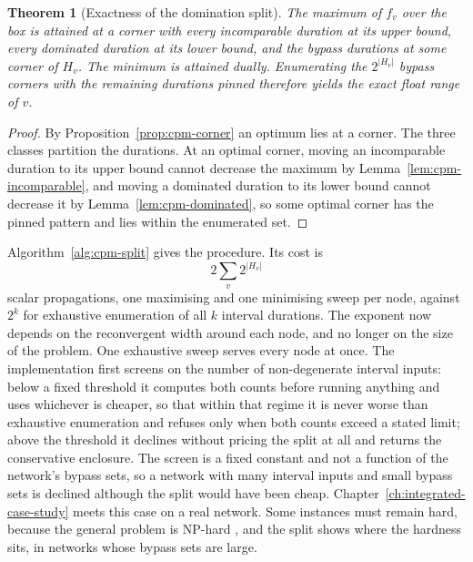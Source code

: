 \documentclass[12pt]{report}
\newtheorem{theorem}{Theorem}
\begin{document}
\begin{theorem}[Exactness of the domination split]
\label{thm:cpm-split}
The maximum of $f_v$ over the box is attained at a corner with every incomparable
duration at its upper bound, every dominated duration at its lower bound, and the bypass
durations at some corner of $H_v$. The minimum is attained dually. Enumerating the
$2^{|H_v|}$ bypass corners with the remaining durations pinned therefore yields the exact
float range of $v$.
\end{theorem}

\begin{proof}
By Proposition~\ref{prop:cpm-corner} an optimum lies at a corner. The three classes
partition the durations. At an optimal corner, moving an incomparable duration to its
upper bound cannot decrease the maximum by Lemma~\ref{lem:cpm-incomparable}, and moving a
dominated duration to its lower bound cannot decrease it by
Lemma~\ref{lem:cpm-dominated}, so some optimal corner has the pinned pattern and lies
within the enumerated set.
\end{proof}

Algorithm~\ref{alg:cpm-split} gives the procedure. Its cost is
\begin{equation}
\label{eq:cpm-split-cost}
2 \sum_{v} 2^{|H_v|}
\end{equation}
scalar propagations, one maximising and one minimising sweep per node, against $2^k$ for
exhaustive enumeration of all $k$ interval durations. The exponent now depends on the reconvergent width around each node, and no longer on the
size of the problem. One exhaustive sweep serves
every node at once. The implementation first screens on the number of non-degenerate
interval inputs: below a fixed threshold it computes both counts before running anything
and uses whichever is cheaper, so that within that regime it is never worse than exhaustive
enumeration and refuses only when both counts exceed a stated limit; above the threshold it
declines without pricing the split at all and returns the conservative enclosure. The
screen is a fixed constant and not a function of the network's bypass sets, so a network
with many interval inputs and small bypass sets is declined although the split would have
been cheap. Chapter~\ref{ch:integrated-case-study} meets this case on a real network. Some instances must remain hard,
because the general problem is NP-hard \cite{chanas2002complexity}, and the split shows
where the hardness sits, in networks whose bypass sets are large.
\end{document}
